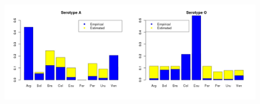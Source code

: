 \documentclass[a4paper,10pt]{article}
\begin{document}
\newpage
\begin{center}
\begin{figure}[H]
\begin{center}
\includegraphics[scale=.35]{FIGURES/FMDV_frequencies_fixed.jpeg}
\end{center}
\caption{}
\label{sfig:freqs}
\end{figure}
\end{center}
\newpage
\end{document}
